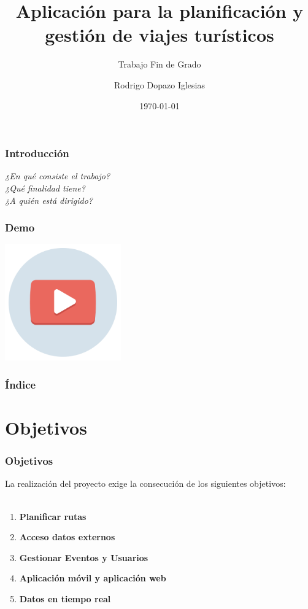 \documentclass{beamer}
\title[Trabajo Fin de Grado] %
{Aplicación para la planificación y gestión de viajes turísticos}
\subtitle{Trabajo Fin de Grado}
\author{
Rodrigo Dopazo Iglesias
}
\institute
{Grado en Ingeniería Informática\\
Mención en Tecnologías de la Información
\and
Universidad da Coruña\\
Facultad de Informática
}
\date
{\today}
\begin{document}
\frame{\titlepage}
 
\begin{frame}
\setlength{\baselineskip}{18pt}
\frametitle{Introducción}
\begin{center}
\textit{¿En qué consiste el trabajo?\\
¿Qué finalidad tiene?\\
¿A quién está dirigido?\\}
\end{center}
\end{frame}


\begin{frame}
\frametitle{Demo}
\begin{center}
\includegraphics[height=5cm]{./img/video.png}
\end{center}
\end{frame}



\begin{frame}
\frametitle{Índice}
\tableofcontents
\end{frame}


\section{Objetivos}
\begin{frame}
\frametitle{Objetivos}
La realización del proyecto exige la consecución de los siguientes objetivos:
\\
\
\begin{enumerate}
 \item<1-> \textbf{Planificar rutas}
 \item<2-> \textbf{Acceso datos externos}
 \item<3-> \textbf{Gestionar Eventos y Usuarios}
 \item<4-> \textbf{Aplicación móvil y aplicación web}
 \item<5-> \textbf{Datos en tiempo real}
\end{enumerate}
\end{frame}
\end{document}
